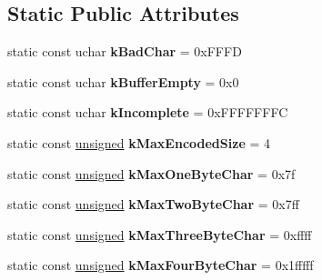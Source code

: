 \subsection*{Static Public Attributes}
\begin{DoxyCompactItemize}
\item 
\mbox{\label{classunibrow_1_1Utf8_a4e5ed3c61ce8976082104caf8f6e2ff8}} 
static const uchar {\bfseries k\+Bad\+Char} = 0x\+F\+F\+FD
\item 
\mbox{\label{classunibrow_1_1Utf8_a204448d9cff6e274e75a5bdd9c1854a2}} 
static const uchar {\bfseries k\+Buffer\+Empty} = 0x0
\item 
\mbox{\label{classunibrow_1_1Utf8_a8aff6f98d4c7f8882b407e981737a123}} 
static const uchar {\bfseries k\+Incomplete} = 0x\+F\+F\+F\+F\+F\+F\+FC
\item 
\mbox{\label{classunibrow_1_1Utf8_a863e13744b7f1bafb2e7cefa88db22e8}} 
static const \mbox{\hyperlink{classunsigned}{unsigned}} {\bfseries k\+Max\+Encoded\+Size} = 4
\item 
\mbox{\label{classunibrow_1_1Utf8_a133ef06049e8474299fe9a84de6f2de0}} 
static const \mbox{\hyperlink{classunsigned}{unsigned}} {\bfseries k\+Max\+One\+Byte\+Char} = 0x7f
\item 
\mbox{\label{classunibrow_1_1Utf8_ab9ef696115d867a8a3d8e66db07d8211}} 
static const \mbox{\hyperlink{classunsigned}{unsigned}} {\bfseries k\+Max\+Two\+Byte\+Char} = 0x7ff
\item 
\mbox{\label{classunibrow_1_1Utf8_a0c0efe6dd154eaddb19bfbc7001307aa}} 
static const \mbox{\hyperlink{classunsigned}{unsigned}} {\bfseries k\+Max\+Three\+Byte\+Char} = 0xffff
\item 
\mbox{\label{classunibrow_1_1Utf8_a7d30c60658c9742cfe77512de617a4b6}} 
static const \mbox{\hyperlink{classunsigned}{unsigned}} {\bfseries k\+Max\+Four\+Byte\+Char} = 0x1fffff
\item 
\mbox{\label{classunibrow_1_1Utf8_ad8db1cc81f7247e91d356a28392c79f9}} 

\end{DoxyCompactItemize}
